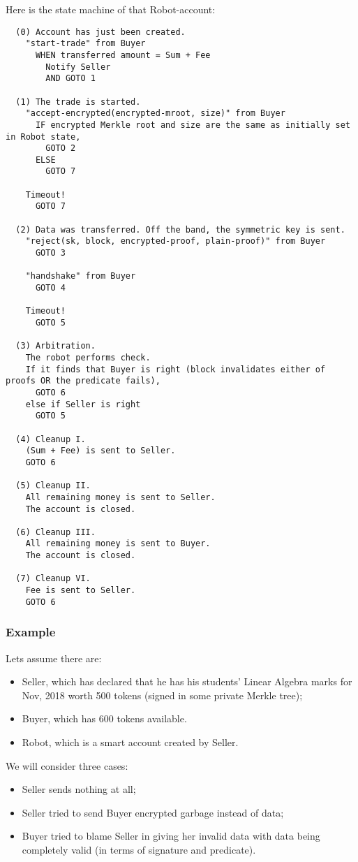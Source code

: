 Here is the state machine of that Robot-account:

\begin{verbatim}
  (0) Account has just been created.
    "start-trade" from Buyer
      WHEN transferred amount = Sum + Fee
        Notify Seller
        AND GOTO 1

  (1) The trade is started.
    "accept-encrypted(encrypted-mroot, size)" from Buyer
      IF encrypted Merkle root and size are the same as initially set in Robot state,
        GOTO 2
      ELSE
        GOTO 7

    Timeout!
      GOTO 7

  (2) Data was transferred. Off the band, the symmetric key is sent.
    "reject(sk, block, encrypted-proof, plain-proof)" from Buyer
      GOTO 3

    "handshake" from Buyer
      GOTO 4

    Timeout!
      GOTO 5

  (3) Arbitration.
    The robot performs check.
    If it finds that Buyer is right (block invalidates either of proofs OR the predicate fails),
      GOTO 6
    else if Seller is right
      GOTO 5

  (4) Cleanup I.
    (Sum + Fee) is sent to Seller.
    GOTO 6

  (5) Cleanup II.
    All remaining money is sent to Seller.
    The account is closed.

  (6) Cleanup III.
    All remaining money is sent to Buyer.
    The account is closed.

  (7) Cleanup VI.
    Fee is sent to Seller.
    GOTO 6

\end{verbatim}

\subsubsection{Example}

Lets assume there are:
\begin{itemize}
  \item Seller, which has declared that he has his students' Linear Algebra marks for Nov, 2018 worth 500 tokens (signed in some private Merkle tree);
  \item Buyer, which has 600 tokens available.
  \item Robot, which is a smart account created by Seller.
\end{itemize}

We will consider three cases:
\begin{itemize}
  \item Seller sends nothing at all;
  \item Seller tried to send Buyer encrypted garbage instead of data;
  \item Buyer tried to blame Seller in giving her invalid data with data being completely valid (in terms of signature and predicate).
\end{itemize}


